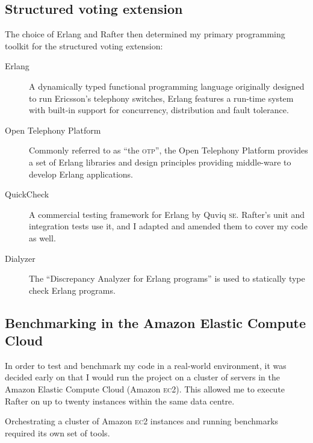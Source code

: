 \documentclass[11pt,chapterprefix=true,toc=bibliography,numbers=noendperiod,
               footnotes=multiple,twoside]{scrreprt}
\newcommand{\ECC}[0]{\textsc{ec}2 }
\begin{document}
\subsection{Structured voting extension}

The choice of Erlang and Rafter then determined my primary programming toolkit for the structured voting extension:

\begin{description}
    \item[Erlang] A dynamically typed functional programming language originally designed to run Ericsson's telephony switches, Erlang features a run-time system with built-in support for concurrency, distribution and fault tolerance.
    \item[Open Telephony Platform] Commonly referred to as \enquote{the \textsc{otp}}, the Open Telephony Platform provides a set of Erlang libraries and design principles providing middle-ware to develop Erlang applications.
    \item[QuickCheck] A commercial testing framework for Erlang by Quviq \textsc{se}. Rafter's unit and integration tests use it, and I adapted and amended them to cover my code as well.
    \item[Dialyzer] The \enquote{Discrepancy Analyzer for Erlang programs} is used to statically type check Erlang programs.
\end{description}

\subsection{Benchmarking in the Amazon Elastic Compute Cloud\label{ssc:ec2-benchmarking}}

In order to test and benchmark my code in a real-world environment, it was decided early on that I would run the project on a cluster of servers in the Amazon Elastic Compute Cloud (Amazon \textsc{ec2}). This allowed me to execute Rafter on up to twenty instances within the same data centre.

Orchestrating a cluster of Amazon \ECC instances and running benchmarks required its own set of tools.
\end{document}
